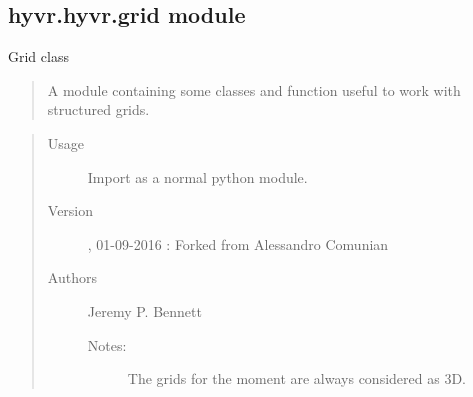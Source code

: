 \documentclass[letterpaper,10pt,english]{sphinxmanual}
\begin{document}
\subsection{hyvr.hyvr.grid module}
\label{hyvr:hyvr-hyvr-grid-module}\label{hyvr:module-hyvr.hyvr.grid}
Grid class
\begin{quote}

A module containing some classes and function useful to work with structured grids.
\end{quote}
\begin{quote}\begin{description}
\item[{Usage}] \leavevmode
Import as a normal python module.

\item[{Version}]  , 01-09-2016 : Forked from Alessandro Comunian

\item[{Authors}] \leavevmode
Jeremy P. Bennett
\begin{description}
\item[{Notes:}] \leavevmode
The grids for the moment are always considered as 3D.

\end{description}

\end{description}\end{quote}
\end{document}

